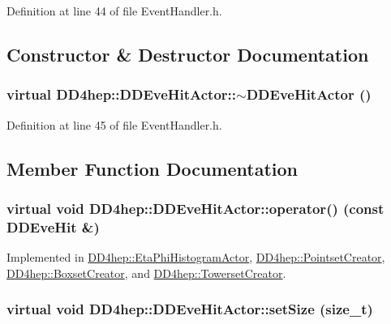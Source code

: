 Definition at line 44 of file EventHandler.h.

\subsection{Constructor \& Destructor Documentation}
\hypertarget{struct_d_d4hep_1_1_d_d_eve_hit_actor_a9706da47b8da6351434ea0f9d41d19d4}{
\subsubsection[{$\sim$DDEveHitActor}]{\setlength{\rightskip}{0pt plus 5cm}virtual DD4hep::DDEveHitActor::$\sim$DDEveHitActor ()}}
\label{struct_d_d4hep_1_1_d_d_eve_hit_actor_a9706da47b8da6351434ea0f9d41d19d4}


Definition at line 45 of file EventHandler.h.

\subsection{Member Function Documentation}
\hypertarget{struct_d_d4hep_1_1_d_d_eve_hit_actor_a612a0a84bfe41620203555b044019788}{
\subsubsection[{operator()}]{\setlength{\rightskip}{0pt plus 5cm}virtual void DD4hep::DDEveHitActor::operator() (const {\bf DDEveHit} \&)}}
\label{struct_d_d4hep_1_1_d_d_eve_hit_actor_a612a0a84bfe41620203555b044019788}


Implemented in \hyperlink{struct_d_d4hep_1_1_eta_phi_histogram_actor_ae0ab6bd1064a336f7cb3f1592a70e063}{DD4hep::EtaPhiHistogramActor}, \hyperlink{struct_d_d4hep_1_1_pointset_creator_ac17113e2952d438023d2b9d6a31d6e36}{DD4hep::PointsetCreator}, \hyperlink{struct_d_d4hep_1_1_boxset_creator_a25f63197d03ad33193ac3c77207db808}{DD4hep::BoxsetCreator}, and \hyperlink{struct_d_d4hep_1_1_towerset_creator_a5afb1ff94fd502e36e56df19effe7221}{DD4hep::TowersetCreator}.\hypertarget{struct_d_d4hep_1_1_d_d_eve_hit_actor_afb0005607761c55de470605dd4cc2acd}{
\subsubsection[{setSize}]{\setlength{\rightskip}{0pt plus 5cm}virtual void DD4hep::DDEveHitActor::setSize (size\_\-t)}}
\label{struct_d_d4hep_1_1_d_d_eve_hit_actor_afb0005607761c55de470605dd4cc2acd}


